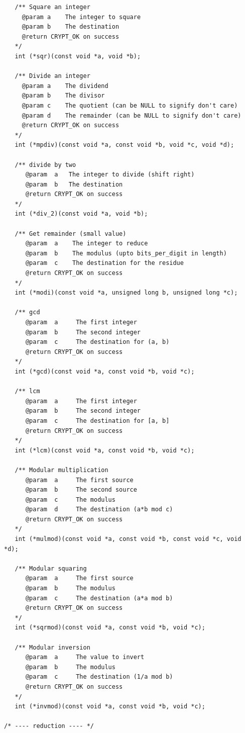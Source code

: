 \documentclass[synpaper]{book}
\begin{document}
\begin{small}
\begin{verbatim}
   /** Square an integer
     @param a    The integer to square
     @param b    The destination
     @return CRYPT_OK on success
   */
   int (*sqr)(const void *a, void *b);

   /** Divide an integer
     @param a    The dividend
     @param b    The divisor
     @param c    The quotient (can be NULL to signify don't care)
     @param d    The remainder (can be NULL to signify don't care)
     @return CRYPT_OK on success
   */
   int (*mpdiv)(const void *a, const void *b, void *c, void *d);

   /** divide by two
      @param  a   The integer to divide (shift right)
      @param  b   The destination
      @return CRYPT_OK on success
   */
   int (*div_2)(const void *a, void *b);

   /** Get remainder (small value)
      @param  a    The integer to reduce
      @param  b    The modulus (upto bits_per_digit in length)
      @param  c    The destination for the residue
      @return CRYPT_OK on success
   */
   int (*modi)(const void *a, unsigned long b, unsigned long *c);

   /** gcd
      @param  a     The first integer
      @param  b     The second integer
      @param  c     The destination for (a, b)
      @return CRYPT_OK on success
   */
   int (*gcd)(const void *a, const void *b, void *c);

   /** lcm
      @param  a     The first integer
      @param  b     The second integer
      @param  c     The destination for [a, b]
      @return CRYPT_OK on success
   */
   int (*lcm)(const void *a, const void *b, void *c);

   /** Modular multiplication
      @param  a     The first source
      @param  b     The second source
      @param  c     The modulus
      @param  d     The destination (a*b mod c)
      @return CRYPT_OK on success
   */
   int (*mulmod)(const void *a, const void *b, const void *c, void *d);

   /** Modular squaring
      @param  a     The first source
      @param  b     The modulus
      @param  c     The destination (a*a mod b)
      @return CRYPT_OK on success
   */
   int (*sqrmod)(const void *a, const void *b, void *c);

   /** Modular inversion
      @param  a     The value to invert
      @param  b     The modulus
      @param  c     The destination (1/a mod b)
      @return CRYPT_OK on success
   */
   int (*invmod)(const void *a, const void *b, void *c);

/* ---- reduction ---- */


\end{verbatim}
\end{small}
\end{document}
